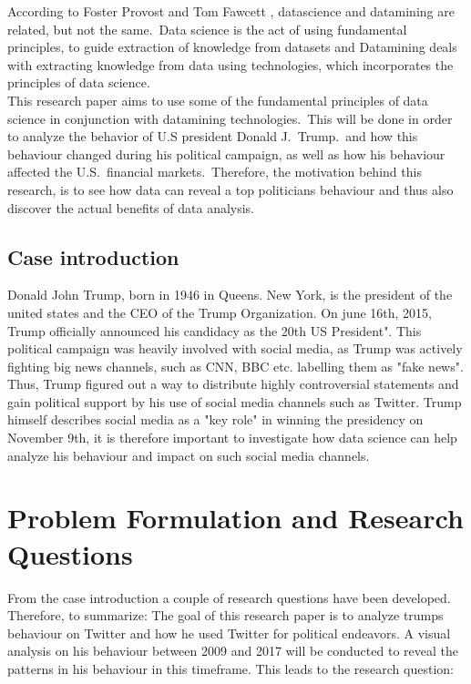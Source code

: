 \documentclass[11pt]{article}
\begin{document}
According to Foster Provost and Tom Fawcett , datascience and datamining are related, but not the same.\  Data science is the act of using fundamental principles, to guide extraction of knowledge from datasets and  Datamining deals with extracting knowledge from data using technologies, which incorporates the principles of data science.\ \citep{foster} \\

This research paper aims to use some of the fundamental principles of data science in conjunction with datamining technologies.\ This will be done in order to analyze the behavior of U.S president Donald J.\ Trump.\ and how this behaviour changed during his political campaign, as well as how his behaviour affected the U.S.\ financial markets.\ Therefore, the motivation behind this research, is to see how data can reveal a top politicians behaviour and thus also discover the actual benefits of data analysis. 


\subsection{Case introduction}
Donald John Trump, born in 1946 in Queens. New York, is the president of the united states and the CEO of the Trump Organization. On june 16th, 2015, Trump officially announced his candidacy as the 20th US President". This political campaign was heavily involved with social media, as Trump was actively fighting big news channels, such as CNN, BBC etc. labelling them as "fake news". Thus, Trump figured out a way to distribute highly controversial statements and gain political support by his use of social media channels such as Twitter. Trump himself describes social media as a "key role" in winning the presidency on November 9th, it is therefore important to investigate how data science can help analyze his behaviour and impact on such social media channels.





\section{Problem Formulation and Research Questions} \label{sec:ch1}
From the case introduction a couple of research questions have been developed. Therefore, to summarize:  The goal of this research paper is to analyze  trumps behaviour on Twitter and how he used Twitter for political endeavors. A visual analysis on his behaviour between 2009 and 2017 will be conducted to reveal the patterns in his behaviour in this timeframe. This leads to the research question: 
\end{document}
